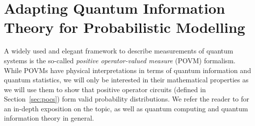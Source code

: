 






\section{Adapting Quantum Information Theory for Probabilistic Modelling}
\label{sec:qit}


A widely used and elegant framework to describe measurements of quantum systems is the so-called \textit{positive operator-valued measure} (POVM) formalism. While POVMs have physical interpretations in terms of quantum information and quantum statistics, we will only be interested in their mathematical properties as we will use them to show that positive operator circuits (defined in Section~\ref{sec:pocs}) form valid probability distributions.
We refer the reader to \citep{nielsen2001quantum} for an in-depth exposition on the topic, as well as quantum computing and quantum information theory in general.


